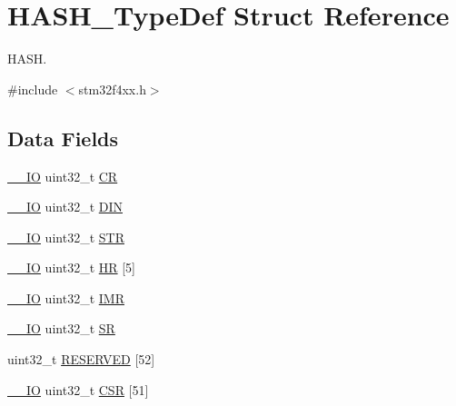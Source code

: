 \hypertarget{struct_h_a_s_h___type_def}{\section{H\-A\-S\-H\-\_\-\-Type\-Def Struct Reference}
\label{struct_h_a_s_h___type_def}
}


H\-A\-S\-H.  




{\ttfamily \#include $<$stm32f4xx.\-h$>$}

\subsection*{Data Fields}
\begin{DoxyCompactItemize}
\item 
\hyperlink{group___c_m_s_i_s__core__definitions_gaec43007d9998a0a0e01faede4133d6be}{\-\_\-\-\_\-\-I\-O} uint32\-\_\-t \hyperlink{struct_h_a_s_h___type_def_ab40c89c59391aaa9d9a8ec011dd0907a}{C\-R}
\item 
\hyperlink{group___c_m_s_i_s__core__definitions_gaec43007d9998a0a0e01faede4133d6be}{\-\_\-\-\_\-\-I\-O} uint32\-\_\-t \hyperlink{struct_h_a_s_h___type_def_a445dd5529e7dc6a4fa2fec4f78da2692}{D\-I\-N}
\item 
\hyperlink{group___c_m_s_i_s__core__definitions_gaec43007d9998a0a0e01faede4133d6be}{\-\_\-\-\_\-\-I\-O} uint32\-\_\-t \hyperlink{struct_h_a_s_h___type_def_a7060ac1ed928ee931d7664650f2dcf75}{S\-T\-R}
\item 
\hyperlink{group___c_m_s_i_s__core__definitions_gaec43007d9998a0a0e01faede4133d6be}{\-\_\-\-\_\-\-I\-O} uint32\-\_\-t \hyperlink{struct_h_a_s_h___type_def_a02cdb629fbb2bfa63db818ac846847a1}{H\-R} \mbox{[}5\mbox{]}
\item 
\hyperlink{group___c_m_s_i_s__core__definitions_gaec43007d9998a0a0e01faede4133d6be}{\-\_\-\-\_\-\-I\-O} uint32\-\_\-t \hyperlink{struct_h_a_s_h___type_def_ae845b86e973b4bf8a33c447c261633f6}{I\-M\-R}
\item 
\hyperlink{group___c_m_s_i_s__core__definitions_gaec43007d9998a0a0e01faede4133d6be}{\-\_\-\-\_\-\-I\-O} uint32\-\_\-t \hyperlink{struct_h_a_s_h___type_def_af6aca2bbd40c0fb6df7c3aebe224a360}{S\-R}
\item 
uint32\-\_\-t \hyperlink{struct_h_a_s_h___type_def_a31675cbea6dc1b5f7de162884a4bb6eb}{R\-E\-S\-E\-R\-V\-E\-D} \mbox{[}52\mbox{]}
\item 
\hyperlink{group___c_m_s_i_s__core__definitions_gaec43007d9998a0a0e01faede4133d6be}{\-\_\-\-\_\-\-I\-O} uint32\-\_\-t \hyperlink{struct_h_a_s_h___type_def_a5a72a62805d5497f2b44448edd18f20f}{C\-S\-R} \mbox{[}51\mbox{]}
\end{DoxyCompactItemize}


